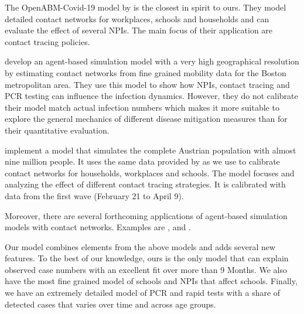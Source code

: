The OpenABM-Covid-19 model by \citet{Hinch2020} is the closest in spirit to ours. They
model detailed contact networks for workplaces, schools and households and can evaluate
the effect of several NPIs. The main focus of their application are contact tracing
policies.

\citet{Aleta2020} develop an agent-based simulation model with a very high geographical
resolution by estimating contact networks from fine grained mobility data for the
Boston metropolitan area. They use this model to show how NPIs, contact tracing and PCR
testing can influence the infection dynamics. However, they do not calibrate their model
match actual infection numbers which makes it more suitable to explore the general
mechanics of different disease mitigation measures than for their quantitative
evaluation.

\citet{Bicher2021} implement a model that simulates the complete Austrian population
with almost nine million people. It uses the same data provided by \citet{Mossong2008}
as we use to calibrate contact networks for households, workplaces and schools. The
model focuses and analyzing the effect of different contact tracing strategies. It is
calibrated with data from the first wave (February 21 to April 9).

Moreover, there are several forthcoming applications of agent-based simulation models
with contact networks. Examples are \citet{Basurto2020}, \citet{DelliGatti2020} and
\citet{Mellacher2020}.

Our model combines elements from the above models and adds several new features. To
the best of our knowledge, ours is the only model that can explain observed case
numbers with an excellent fit over more than 9 Months. We also have the most fine
grained model of schools and NPIs that affect schools. Finally, we have an extremely
detailed model of PCR and rapid tests with a share of detected cases that varies over
time and across age groups.


